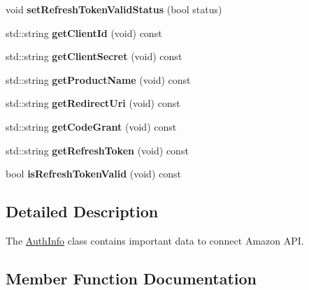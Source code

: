 \begin{DoxyCompactItemize}
void {\bfseries set\+Refresh\+Token\+Valid\+Status} (bool status)
\item 
\mbox{\label{classAuth_1_1AuthInfo_a845886c67528249b09924e67c684c789}} 
std\+::string {\bfseries get\+Client\+Id} (void) const
\item 
\mbox{\label{classAuth_1_1AuthInfo_a9df5f7211413ec115a36c8dca9ea4420}} 
std\+::string {\bfseries get\+Client\+Secret} (void) const
\item 
\mbox{\label{classAuth_1_1AuthInfo_a41ae415f3d6f918dfbb9cf25d44b0fdd}} 
std\+::string {\bfseries get\+Product\+Name} (void) const
\item 
\mbox{\label{classAuth_1_1AuthInfo_a17644793f32fca68f26b1220c969dee7}} 
std\+::string {\bfseries get\+Redirect\+Uri} (void) const
\item 
\mbox{\label{classAuth_1_1AuthInfo_a99511ef4fe2e587d4292492a0fe3be45}} 
std\+::string {\bfseries get\+Code\+Grant} (void) const
\item 
\mbox{\label{classAuth_1_1AuthInfo_a4fed5d4d14bbecd3296ac66827e331a3}} 
std\+::string {\bfseries get\+Refresh\+Token} (void) const
\item 
\mbox{\label{classAuth_1_1AuthInfo_af246cbe40bd43bca06a55538a1b6a896}} 
bool {\bfseries is\+Refresh\+Token\+Valid} (void) const
\end{DoxyCompactItemize}


\subsection{Detailed Description}
The \hyperlink{classAuth_1_1AuthInfo}{Auth\+Info} class contains important data to connect Amazon A\+PI. 

\subsection{Member Function Documentation}
\mbox{\label{classAuth_1_1AuthInfo_a5de00b6ffe9720a53ad2627fd78c4f47}} 
